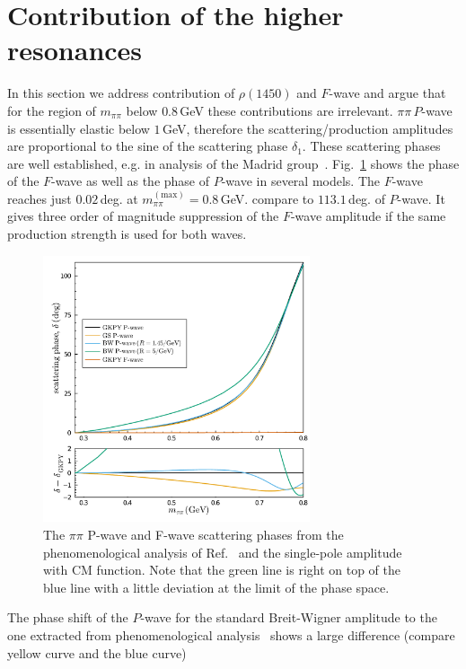 \documentclass[aps,prd,superscriptaddress,onecolumn,nofootinbib,preprintnumbers,notitlepage]{revtex4-1}
\begin{document}
\newpage

\appendix

\section{Contribution of the higher resonances}
In this section we address contribution of $\rho(1450)$ and $F$-wave
and argue that for the region of $m_{\pi\pi}$ below $0.8\,$GeV these contributions
are irrelevant. $\pi\pi\,P$-wave is essentially elastic below $1\,$GeV,
therefore the scattering/production amplitudes are proportional
to the sine of the scattering phase $\delta_1$.
These scattering phases are well established, e.g. in analysis of the Madrid group~\cite{GarciaMartin:2011cn}.
Fig.~\ref{fig:scatt.phases} shows the phase of the $F$-wave as well as the phase
of $P$-wave in several models. The $F$-wave reaches just $0.02\,$deg. at $m_{\pi\pi}^{(\text{max})}=0.8\,$GeV. compare to $113.1\,$deg. of $P$-wave.
It gives three order of magnitude suppression of the $F$-wave amplitude if the same production strength is used for both waves.
\begin{figure}
  \includegraphics[width=0.7\textwidth]{plots/Pwave_phaseshift.pdf}
  \caption{The $\pi\pi$ P-wave and F-wave scattering phases from the phenomenological analysis of Ref.~\cite{GarciaMartin:2011cn} and the single-pole amplitude with CM function.
  Note that the green line is right on top of the blue line with a little deviation at the limit of the phase space.}
  \label{fig:scatt.phases}
\end{figure}

The phase shift of the $P$-wave for the standard Breit-Wigner amplitude to the one extracted from phenomenological analysis~\cite{GarciaMartin:2011cn} shows a large difference (compare yellow curve and the blue curve)
\end{document}
